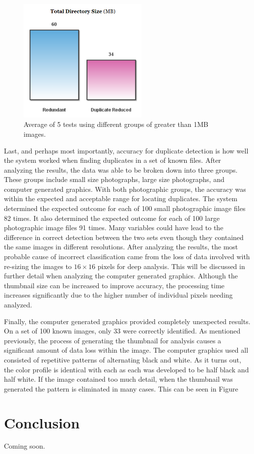 \begin{figure}[htbp]
\centering
\includegraphics[width=2.5in]{largeaverage}
\caption{Average of 5 tests using different groups of greater than 1MB images.}
\label{fig:largeaverage}
\end{figure}

Last, and perhaps most importantly, accuracy for duplicate detection is how well the system worked when finding duplicates in a set of known files. After analyzing the results, the data was able to be broken down into three groups. These groups include small size photographs, large size photographs, and computer generated graphics. With both photographic groups, the accuracy was within the expected and acceptable range for locating duplicates. The system determined the expected outcome for each of 100 small photographic image files 82 times. It also determined the expected outcome for each of 100 large photographic image files 91 times. Many variables could have lead to the difference in correct detection between the two sets even though they contained the same images in different resolutions. After analyzing the results, the most probable cause of incorrect classification came from the loss of data involved with re-sizing the images to $16 \times 16$ pixels for deep analysis. This will be discussed in further detail when analyzing the computer generated graphics. Although the thumbnail size can be increased to improve accuracy, the processing time increases significantly due to the higher number of individual pixels needing analyzed.

Finally, the computer generated graphics provided completely unexpected results. On a set of 100 known images, only 33 were correctly identified. As mentioned previously, the process of generating the thumbnail for analysis causes a significant amount of data loss within the image. The computer graphics used all consisted of repetitive patterns of alternating black and white. As it turns out, the color profile is identical with each as each was developed to be half black and half white. If the image contained too much detail, when the thumbnail was generated the pattern is eliminated in many cases. This can be seen in Figure 
 
\section{Conclusion}
Coming soon.